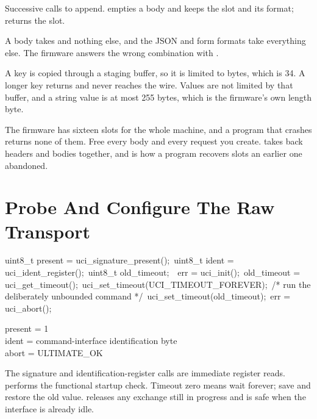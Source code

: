 Successive calls to  append.
 empties a body and keeps the slot and its
format;  returns the slot.

A  body takes  and
nothing else, and the JSON and form formats take everything else. The firmware
answers the wrong combination with .

A key is copied through a staging buffer, so it is limited to
 bytes, which is 34. A longer key returns
 and never reaches the wire. Values are
not limited by that buffer, and a string value is at most 255 bytes, which is
the firmware's own length byte.

\begin{warning}
The firmware has sixteen slots for the whole machine, and a program that
crashes returns none of them. Free every body and every request you create.
 takes back headers and bodies together, and is
how a program recovers slots an earlier one abandoned.
\end{warning}


\section{Probe And Configure The Raw Transport}

\begin{listingbox}
uint8\_t present = uci\_signature\_present();\
uint8\_t ident = uci\_ident\_register();\
uint8\_t old\_timeout;\
\
err = uci\_init();\
old\_timeout = uci\_get\_timeout();\
uci\_set\_timeout(UCI\_TIMEOUT\_FOREVER);\
/* run the deliberately unbounded command */\
uci\_set\_timeout(old\_timeout);\
err = uci\_abort();
\end{listingbox}

\begin{resultbox}
present = 1\\
ident = command-interface identification byte\\
abort = ULTIMATE_OK
\end{resultbox}

The signature and identification-register calls are immediate register reads.
\cmd{uci\_init()} performs the functional startup check. Timeout zero means
wait forever; save and restore the old value.  releases any
exchange still in progress and is safe when the interface is already idle.

